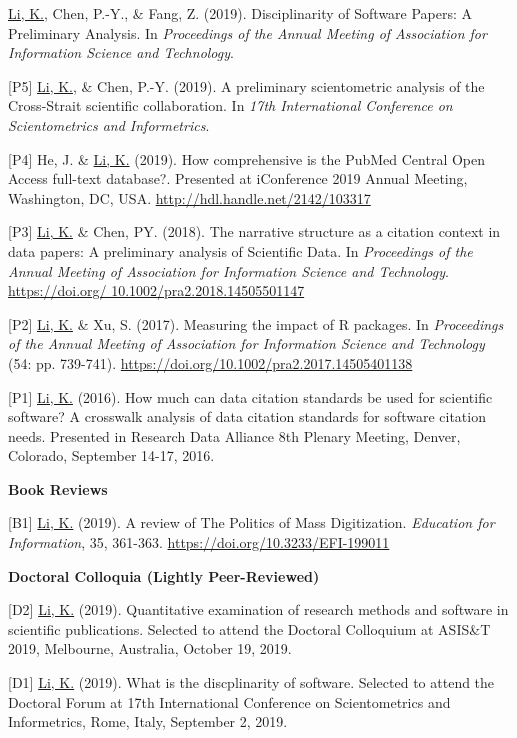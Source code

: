 \documentclass[margin, 10pt]{res} %
\begin{document}
\begin{resume}
[P6] \underline{Li, K.}, Chen, P.-Y., \& Fang, Z. (2019). Disciplinarity of Software Papers: A Preliminary Analysis. In \textit{Proceedings of the Annual Meeting of Association for Information Science and Technology}.

[P5] \underline{Li, K.}, \& Chen, P.-Y. (2019). A preliminary scientometric analysis of the Cross-Strait scientific collaboration. In \textit{17th International Conference on Scientometrics and Informetrics}.

[P4] He, J. \& \underline{Li, K.} (2019). How comprehensive is the PubMed Central Open Access full-text database?. Presented at iConference 2019 Annual Meeting, Washington, DC, USA. \href{http://hdl.handle.net/2142/103317}{http://hdl.handle.net/2142/103317}

[P3] \underline{Li, K.} \& Chen, PY. (2018). The narrative structure as a citation context in data papers: A preliminary analysis of Scientific Data. In \textit{Proceedings of the Annual Meeting of Association for Information Science and Technology}. \href{https://doi.org/10.1002/pra2.2018.14505501147}{https://doi.org/ 10.1002/pra2.2018.14505501147}

[P2] \underline{Li, K.} \& Xu, S. (2017). Measuring the impact of R packages. In \textit{Proceedings of the Annual Meeting of Association for Information Science and Technology} (54: pp. 739-741). \href{https://doi.org/10.1002/pra2.2017.14505401138}{https://doi.org/10.1002/pra2.2017.14505401138}

[P1] \underline{Li, K.} (2016). How much can data citation standards be used for scientific software? A crosswalk analysis of data citation standards for software citation needs. Presented in Research Data Alliance 8th Plenary Meeting, Denver, Colorado, September 14-17, 2016.

\textbf{Book Reviews}

[B1] \underline{Li, K.} (2019). A review of The Politics of Mass Digitization. \textit{Education for Information}, 35, 361-363. \href{https://doi.org/10.3233/EFI-199011}{https://doi.org/10.3233/EFI-199011}

\textbf{Doctoral Colloquia (Lightly Peer-Reviewed)}

[D2] \underline{Li, K.} (2019). Quantitative examination of research methods and software in scientific publications. Selected to attend the Doctoral Colloquium at ASIS\&T 2019, Melbourne, Australia, October 19, 2019.

[D1] \underline{Li, K.} (2019). What is the discplinarity of software. Selected to attend the Doctoral Forum at 17th International Conference on Scientometrics and Informetrics, Rome, Italy, September 2, 2019.


\end{resume}
\end{document}
